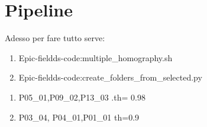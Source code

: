 \section{Pipeline}
Adesso per fare tutto serve:
\begin{enumerate}
    \item Epic-fieldds-code:multiple_homography.sh
    \item Epic-fieldds-code:create_folders_from_selected.py
\end{enumerate}

\begin{enumerate}
    \item P05_01,P09_02,P13_03 .th= 0.98
    \item P03_04, P04_01,P01_01 th=0.9
\end{enumerate}